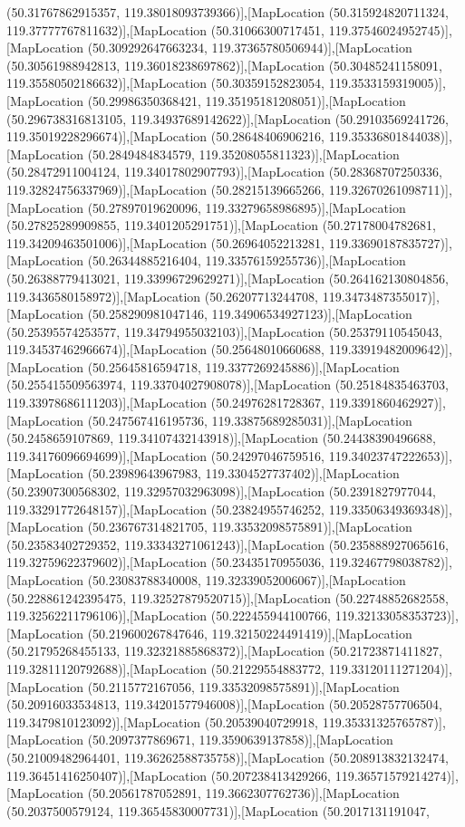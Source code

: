 (50.31767862915357, 119.38018093739366)],[MapLocation (50.315924820711324, 119.37777767811632)],[MapLocation (50.31066300717451, 119.37546024952745)],[MapLocation (50.309292647663234, 119.37365780506944)],[MapLocation (50.30561988942813, 119.36018238697862)],[MapLocation (50.30485241158091, 119.35580502186632)],[MapLocation (50.30359152823054, 119.3533159319005)],[MapLocation (50.29986350368421, 119.35195181208051)],[MapLocation (50.296738316813105, 119.34937689142622)],[MapLocation (50.29103569241726, 119.35019228296674)],[MapLocation (50.28648406906216, 119.35336801844038)],[MapLocation (50.2849484834579, 119.35208055811323)],[MapLocation (50.28472911004124, 119.34017802907793)],[MapLocation (50.28368707250336, 119.32824756337969)],[MapLocation (50.28215139665266, 119.32670261098711)],[MapLocation (50.27897019620096, 119.33279658986895)],[MapLocation (50.27825289909855, 119.3401205291751)],[MapLocation (50.27178004782681, 119.34209463501006)],[MapLocation (50.26964052213281, 119.33690187835727)],[MapLocation (50.26344885216404, 119.33576159255736)],[MapLocation (50.26388779413021, 119.33996729629271)],[MapLocation (50.264162130804856, 119.3436580158972)],[MapLocation (50.26207713244708, 119.3473487355017)],[MapLocation (50.258290981047146, 119.34906534927123)],[MapLocation (50.25395574253577, 119.34794955032103)],[MapLocation (50.25379110545043, 119.34537462966674)],[MapLocation (50.25648010660688, 119.33919482009642)],[MapLocation (50.25645816594718, 119.3377269245886)],[MapLocation (50.255415509563974, 119.33704027908078)],[MapLocation (50.25184835463703, 119.33978686111203)],[MapLocation (50.24976281728367, 119.3391860462927)],[MapLocation (50.247567416195736, 119.33875689285031)],[MapLocation (50.2458659107869, 119.34107432143918)],[MapLocation (50.24438390496688, 119.34176096694699)],[MapLocation (50.24297046759516, 119.34023747222653)],[MapLocation (50.23989643967983, 119.3304527737402)],[MapLocation (50.23907300568302, 119.32957032963098)],[MapLocation (50.2391827977044, 119.33291772648157)],[MapLocation (50.23824955746252, 119.33506349369348)],[MapLocation (50.236767314821705, 119.33532098575891)],[MapLocation (50.23583402729352, 119.33343271061243)],[MapLocation (50.235888927065616, 119.32759622379602)],[MapLocation (50.23435170955036, 119.32467798038782)],[MapLocation (50.23083788340008, 119.32339052006067)],[MapLocation (50.228861242395475, 119.32527879520715)],[MapLocation (50.22748852682558, 119.32562211796106)],[MapLocation (50.222455944100766, 119.32133058353723)],[MapLocation (50.219600267847646, 119.32150224491419)],[MapLocation (50.21795268455133, 119.32321885868372)],[MapLocation (50.21723871411827, 119.32811120792688)],[MapLocation (50.21229554883772, 119.33120111271204)],[MapLocation (50.2115772167056, 119.33532098575891)],[MapLocation (50.20916033534813, 119.34201577946008)],[MapLocation (50.20528757706504, 119.3479810123092)],[MapLocation (50.20539040729918, 119.35331325765787)],[MapLocation (50.2097377869671, 119.3590639137858)],[MapLocation (50.21009482964401, 119.36262588735758)],[MapLocation (50.208913832132474, 119.36451416250407)],[MapLocation (50.207238413429266, 119.36571579214274)],[MapLocation (50.20561787052891, 119.3662307762736)],[MapLocation (50.2037500579124, 119.36545830007731)],[MapLocation (50.2017131191047, 